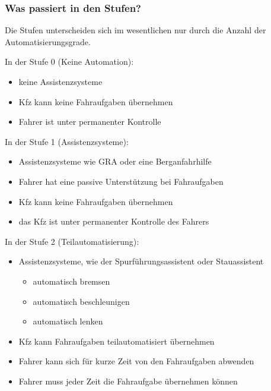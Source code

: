 \subsubsection{Was passiert in den Stufen?}
Die Stufen unterscheiden sich im wesentlichen nur durch die Anzahl der Automatisierungsgrade.

\vspace{0.5cm}

In der Stufe 0 (Keine Automation):
\begin{itemize}
	\item keine Assistenzsysteme
	\item \ac{Kfz} kann keine Fahraufgaben übernehmen
	\item Fahrer ist unter permanenter Kontrolle
\end{itemize}

\vspace{0.5cm}

In der Stufe 1 (Assistenzsysteme):
\begin{itemize}
	\item Assistenzsysteme wie \ac{GRA} oder eine Berganfahrhilfe
	\item Fahrer hat eine passive Unterstützung bei Fahraufgaben
	\item \ac{Kfz} kann keine Fahraufgaben übernehmen
	\item das \ac{Kfz} ist unter permanenter Kontrolle des Fahrers
\end{itemize}

\vspace{0.5cm}

In der Stufe 2 (Teilautomatisierung):
\begin{itemize}
	\item Assistenzsysteme, wie der Spurführungsassistent oder Stauassistent
	      \begin{itemize}
		      \item automatisch bremsen
		      \item automatisch beschleunigen
		      \item automatisch lenken
	      \end{itemize}
	\item \ac{Kfz} kann Fahraufgaben teilautomatisiert übernehmen
	\item Fahrer kann sich für kurze Zeit von den Fahraufgaben abwenden
	\item Fahrer muss jeder Zeit die Fahraufgabe übernehmen können
\end{itemize}

